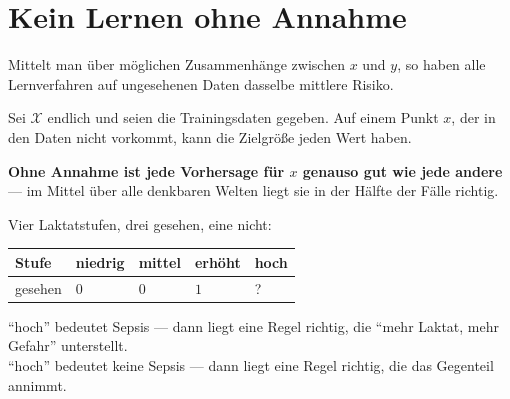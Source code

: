 \section{Kein Lernen ohne Annahme}

\begin{merksatz}
Mittelt man über  möglichen Zusammenhänge zwischen $x$ und $y$, so haben alle Lernverfahren auf ungesehenen Daten dasselbe mittlere Risiko.

Sei $\mathcal X$ endlich und seien die Trainingsdaten gegeben. Auf einem Punkt $x$, der in den Daten nicht vorkommt, kann die Zielgröße jeden Wert haben.

\begin{center}
\begin{minipage}{0.9\textwidth}
\textbf{Ohne Annahme ist jede Vorhersage für $x$ genauso gut wie jede andere} --- im Mittel über alle denkbaren Welten liegt sie in der Hälfte der Fälle richtig.
\end{minipage}
\end{center}

Vier Laktatstufen, drei gesehen, eine nicht:
\begin{center}
{\small
\renewcommand{\arraystretch}{1.5}
\begin{tabular}{@{}P{2.2cm}P{1.4cm}P{1.4cm}P{1.4cm}P{1.4cm}@{}}
\toprule
\textbf{Stufe} & niedrig & mittel & erhöht & \textbf{hoch}\\
\midrule
gesehen & $0$ & $0$ & $1$ & \textcolor{akzent}{?}\\
\bottomrule
\end{tabular}}
\end{center}

 \enquote{hoch} bedeutet Sepsis --- dann liegt eine Regel richtig, die \enquote{mehr Laktat, mehr Gefahr} unterstellt.\\
 \enquote{hoch} bedeutet keine Sepsis --- dann liegt eine Regel richtig, die das Gegenteil annimmt.

\begin{center}
\begin{minipage}{0.88\textwidth}
\end{minipage}
\end{center}
\end{merksatz}

